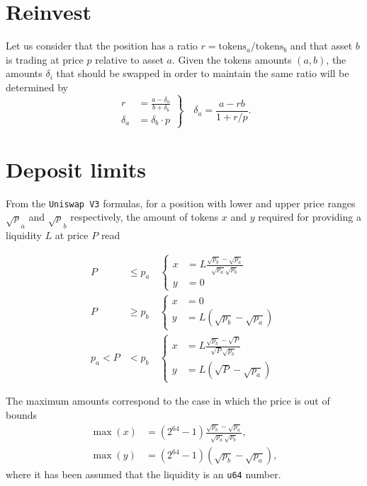 \documentclass[a4paper]{article}
\begin{document}
\section{Reinvest}
Let us consider that the position has a ratio
\( r = {\text{tokens}_a}/{\text{tokens}_b} \)
and that asset \(b\) is trading at price \(p\) relative to asset \(a\).
Given the tokens amounts \((a,b)\), the amounts \(\delta_i\) that should be swapped in order to maintain the same ratio will be determined by
\begin{equation}
	\left.
	\begin{aligned}
		r        & = \frac{a - \delta_a}{b+\delta_b} \\
		\delta_a & = \delta_b  \cdot p
	\end{aligned}
	\right\} \quad \delta_a  = \frac{a - r b}{1 + r/p}.
\end{equation}


\section{Deposit limits}
From the \texttt{Uniswap~V3} formulas, for a position with lower and upper price ranges \(\sqrt p_a\) and \(\sqrt p_b\) respectively, the amount of tokens \(x\) and \(y\) required for providing a liquidity \(L\) at price \(P\) read

\begin{equation}
	\begin{aligned}
		P       & \le p_a \quad \left\{ \begin{aligned}
			x & = L \frac{\sqrt{p_b} - \sqrt{p_a}}{\sqrt{p_a} \sqrt{p_b}} \\
			y & = 0
		\end{aligned} \right. \\
		P       & \ge p_b \quad \left\{ \begin{aligned}
			x & = 0                                      \\
			y & = L \left(\sqrt{p_b} - \sqrt{p_a}\right)
		\end{aligned} \right. \\
		p_a < P & < p_b \quad \left\{ \begin{aligned}
			x & = L \frac{\sqrt{p_b} - \sqrt{P}}{\sqrt{P} \sqrt{p_b}} \\
			y & = L \left(\sqrt{P} - \sqrt{p_a}\right)
		\end{aligned} \right.
	\end{aligned}
\end{equation}


The maximum amounts correspond to the case in which the price is out of bounds
\begin{align}
	\max(x) & = (2^{64}-1) \frac{\sqrt{p_b} - \sqrt{p_a}}{\sqrt{p_a} \sqrt{p_b}}, \\
	\max(y) & = (2^{64}-1) \left(\sqrt{p_b} - \sqrt{p_a}\right),
\end{align}
where it has been assumed that the liquidity is an \texttt{u64} number.
\end{document}
